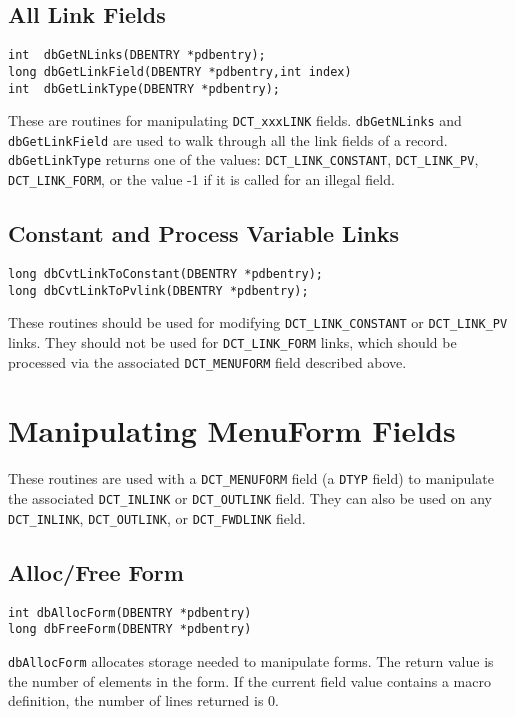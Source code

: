 \subsection{All Link Fields}

\begin{verbatim}int  dbGetNLinks(DBENTRY *pdbentry);
long dbGetLinkField(DBENTRY *pdbentry,int index)
int  dbGetLinkType(DBENTRY *pdbentry);
\end{verbatim}
These are routines for manipulating \verb|DCT_xxxLINK| fields. \verb|dbGetNLinks| and \verb|dbGetLinkField| are used to walk 
through all the link fields of a record. \verb|dbGetLinkType| returns one of the values: \verb|DCT_LINK_CONSTANT|, 
\verb|DCT_LINK_PV|, \verb|DCT_LINK_FORM|, or the value -1 if it is called for an illegal field.

\subsection{Constant and Process Variable Links}

\begin{verbatim}long dbCvtLinkToConstant(DBENTRY *pdbentry);
long dbCvtLinkToPvlink(DBENTRY *pdbentry);
\end{verbatim}
These routines should be used for modifying \verb|DCT_LINK_CONSTANT| or \verb|DCT_LINK_PV| links. They should not be used 
for \verb|DCT_LINK_FORM| links, which should be processed via the associated \verb|DCT_MENUFORM| field described above.

\section{Manipulating MenuForm Fields}

These routines are used with a \verb|DCT_MENUFORM| field (a \verb|DTYP| field) to manipulate the associated \verb|DCT_INLINK| or 
\verb|DCT_OUTLINK| field. They can also be used on any \verb|DCT_INLINK|, \verb|DCT_OUTLINK|, or \verb|DCT_FWDLINK| field.

\subsection{Alloc/Free Form}

\begin{verbatim}int dbAllocForm(DBENTRY *pdbentry)
long dbFreeForm(DBENTRY *pdbentry)
\end{verbatim}
\verb|dbAllocForm| allocates storage needed to manipulate forms. The return value is the number of elements in the form. If 
the current field value contains a macro definition, the number of lines returned is 0.

